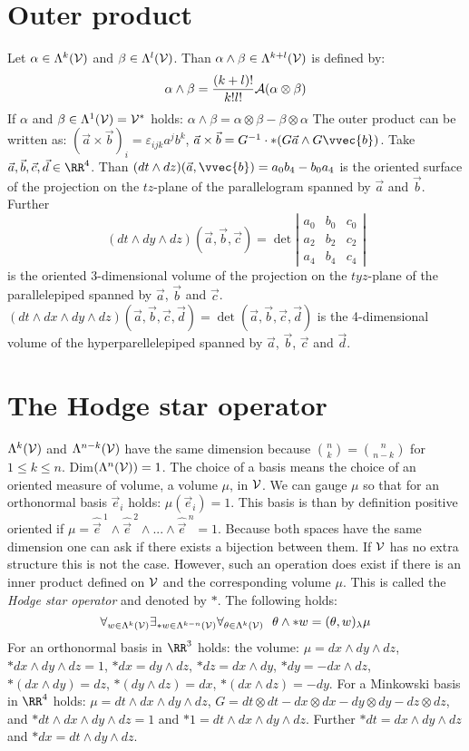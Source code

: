 \section{Outer product}
Let $\alpha\in\Lambda^k(\cal V)$ and $\beta\in\Lambda^l(\cal V)$. Than
$\alpha\wedge\beta\in\Lambda^{k+l}(\cal V)$ is defined by:
\[
\alpha\wedge\beta=\frac{(k+l)!}{k!l!}{\cal A}(\alpha\otimes\beta)
\]
If $\alpha$ and $\beta\in\Lambda^1(\cal V)={\cal V}^*$ holds:
$\alpha\wedge\beta=\alpha\otimes\beta-\beta\otimes\alpha$
\npar
The outer product can be written as: $(\vec{a}\times\vec{b})_i=\varepsilon_{ijk}a^jb^k$,
$\vec{a}\times\vec{b}=G^{-1}\cdot*(G\vec{a}\wedge G\vvec{b})$.
\npar
Take $\vec{a},\vec{b},\vec{c},\vec{d}\in\RR^4$. Than
$(dt\wedge dz)(\vec{a},\vvec{b})=a_0b_4-b_0a_4$ is the oriented surface of the
projection on the $tz$-plane of the parallelogram spanned by $\vec{a}$ and
$\vec{b}$.
\npar
Further
\[
(dt\wedge dy\wedge dz)(\vec{a},\vec{b},\vec{c})=\det\left|\begin{array}{ccc}
a_0&b_0&c_0\\ a_2&b_2&c_2\\ a_4&b_4&c_4 \end{array}\right|
\]
is the oriented 3-dimensional volume of the projection on the $tyz$-plane of
the parallelepiped spanned by $\vec{a}$, $\vec{b}$ and $\vec{c}$.
\npar
$(dt\wedge dx\wedge dy\wedge dz)(\vec{a},\vec{b},\vec{c},\vec{d})=\det(\vec{a},\vec{b},\vec{c},\vec{d})$
is the 4-dimensional volume of the hyperparellelepiped spanned by
$\vec{a}$, $\vec{b}$, $\vec{c}$ and $\vec{d}$.

\section{The Hodge star operator}
$\Lambda^k(\cal V)$ and $\Lambda^{n-k}(\cal V)$ have the same dimension
because ${n\choose k}={n\choose{n-k}}$ for $1\leq k\leq n$.
Dim$(\Lambda^n({\cal V}))=1$. The choice of a basis means the choice of an oriented
measure of volume, a volume $\mu$, in $\cal V$. We can gauge $\mu$ so that for
an orthonormal basis $\vec{e}_i$ holds: $\mu(\vec{e}_i)=1$. This basis is than
by definition positive oriented if
$\mu=\hat{\vec{e}}^{~1}\wedge \hat{\vec{e}}^{~2}\wedge...\wedge \hat{\vec{e}}^{~n}=1$.
\npar
Because both spaces have the same dimension one can ask if there exists a
bijection between them. If $\cal V$ has no extra structure this is not the
case. However, such an operation does exist if there is an inner product
defined on $\cal V$ and the corresponding volume $\mu$. This is called
the {\it Hodge star operator} and denoted by $*$. The following holds:
\[
\forall_{w\in\Lambda^k({\cal V})}\exists_{*w\in\Lambda^{k-n}({\cal V})}\forall_{\theta\in\Lambda^k({\cal V})}~~
\theta\wedge*w=(\theta,w)_\lambda\mu
\]
For an orthonormal basis in $\RR^3$ holds: the volume: $\mu=dx\wedge dy\wedge dz$,
$*dx\wedge dy\wedge dz=1$, $*dx=dy\wedge dz$, $*dz=dx\wedge dy$, $*dy=-dx\wedge dz$,
$*(dx\wedge dy)=dz$, $*(dy\wedge dz)=dx$, $*(dx\wedge dz)=-dy$.
\npar
For a Minkowski basis in $\RR^4$ holds: $\mu=dt\wedge dx\wedge dy\wedge dz$,
$G=dt\otimes dt-dx\otimes dx-dy\otimes dy-dz\otimes dz$, and
$*dt\wedge dx\wedge dy\wedge dz=1$ and $*1=dt\wedge dx\wedge dy\wedge dz$.
Further $*dt=dx\wedge dy\wedge dz$ and $*dx=dt\wedge dy\wedge dz$.

